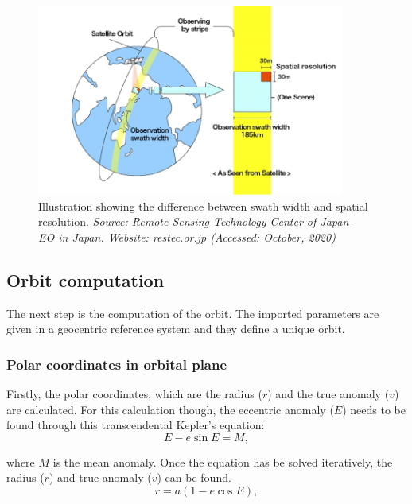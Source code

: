 \begin{figure}
\centering
\includegraphics[width=0.9\textwidth]{Images/swath_width.png}\caption{Illustration showing the difference between swath width and spatial resolution. \textit{Source: Remote Sensing Technology Center of Japan - EO in Japan. Website: restec.or.jp (Accessed: October, 2020)}} %
\label{swath_width} 
\end{figure}

\bigskip
\subsection{Orbit computation}
\bigskip

The next step is the computation of the orbit. The imported parameters are given in a geocentric reference system and they define a unique orbit.

\bigskip
\subsubsection{Polar coordinates in orbital plane}
\bigskip

Firstly, the polar coordinates, which are the radius ($r$) and the true anomaly ($v$) are calculated. For this calculation though, the eccentric anomaly ($E$) needs to be found through this transcendental Kepler's equation:
\begin{equation}
E - e \sin{E} = M,
\end{equation}

where $M$ is the mean anomaly. Once the equation has be solved iteratively, the radius ($r$) and true anomaly ($v$) can be found.
\begin{equation}
r = a(1 - e \cos{E}),
\end{equation}

